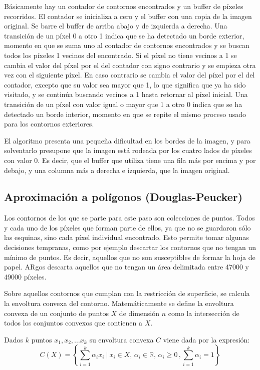 Básicamente hay un contador de contornos encontrados y un buffer de píxeles recorridos. El contador
se inicializa a cero y el buffer con una copia de la imagen original. Se barre el buffer de arriba
abajo y de izquierda a derecha. Una transición de un píxel 0 a otro 1 indica que se ha detectado un
borde exterior, momento en que se suma uno al contador de contornos encontrados y se buscan todos
los píxeles 1 vecinos del encontrado. Si el píxel no tiene vecinos a 1 se cambia el valor del píxel
por el del contador con signo contrario y se empieza otra vez con el siguiente píxel. En caso
contrario se cambia el valor del píxel por el del contador, excepto que su valor sea mayor que 1, lo
que significa que ya ha sido visitado, y se continúa buscando vecinos a 1 hasta retornar al píxel
inicial. Una transición de un píxel con valor igual o mayor que 1 a otro 0 indica que se ha
detectado un borde interior, momento en que se repite el mismo proceso usado para los contornos
exteriores.

El algoritmo presenta una pequeña dificultad en los bordes de la imagen, y para solventarlo
presupone que la imagen está rodeada por los cuatro lados de píxeles con valor 0. Es decir, que el
buffer que utiliza tiene una fila más por encima y por debajo, y una columna más a derecha e
izquierda, que la imagen original.



\subsection{Aproximación a polígonos (Douglas-Peucker)}
Los contornos de los que se parte para este paso son colecciones de puntos. Todos y cada uno de los
píxeles que forman parte de ellos, ya que no se guardaron sólo las esquinas, sino cada píxel
individual encontrado. Esto permite tomar algunas decisiones tempranas, como por ejemplo descartar
los contornos que no tengan un mínimo de puntos. Es decir, aquellos que no son susceptibles de formar
la hoja de papel. ARgos descarta aquellos que no tengan un área delimitada entre 47000 y 49000
píxeles.

Sobre aquellos contornos que cumplan con la restricción de superficie, se calcula la envoltura
convexa del contorno. Matemáticamente se define la envoltura convexa de un conjunto de puntos $X$ de
dimensión $n$ como la intersección de todos los conjuntos convexos que contienen a $X$.

Dados $k$ puntos $x_1, x_2,\dots x_k$ su envoltura convexa $C$ viene dada por la expresión:
\begin{equation}
C(X) =\left\{\sum_{i=1}^k \alpha_i x_i \ \Bigg | \ x_i\in X, \, \alpha_i\in \mathbb{R}, \, \alpha_i \geq 0 \, , \sum_{i=1}^k \alpha_i=1\right\}
\end{equation}

